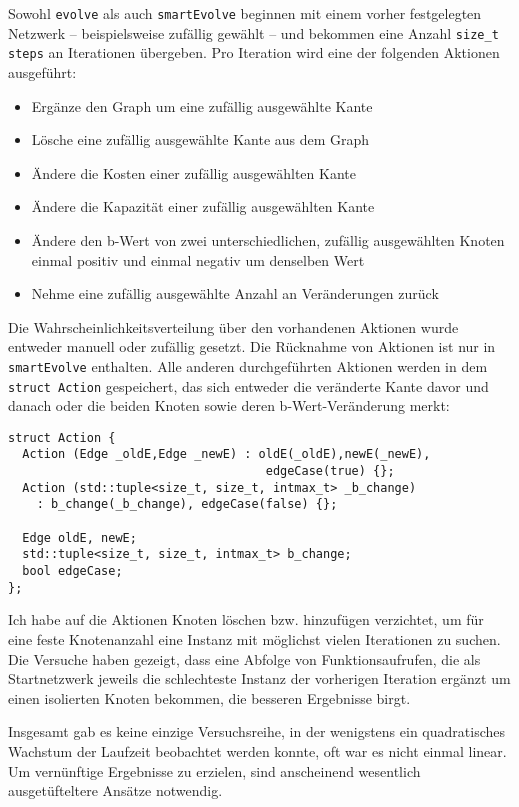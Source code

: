 Sowohl \lstinline|evolve| als auch \lstinline|smartEvolve| beginnen mit einem vorher festgelegten Netzwerk -- beispielsweise zufällig gewählt -- und bekommen eine Anzahl \lstinline|size_t steps| an Iterationen übergeben. Pro Iteration wird eine der folgenden Aktionen ausgeführt:
\begin{itemize}\itemsep0em
    \item Ergänze den Graph um eine zufällig ausgewählte Kante
    \item Lösche eine zufällig ausgewählte Kante aus dem Graph
    \item Ändere die Kosten einer zufällig ausgewählten Kante
    \item Ändere die Kapazität einer zufällig ausgewählten Kante
    \item Ändere den b-Wert von zwei unterschiedlichen, zufällig ausgewählten Knoten einmal positiv und einmal negativ um denselben Wert
    \item Nehme eine zufällig ausgewählte Anzahl an Veränderungen zurück
\end{itemize}

Die Wahrscheinlichkeitsverteilung über den vorhandenen Aktionen wurde entweder manuell oder zufällig gesetzt. Die Rücknahme von Aktionen ist nur in \lstinline|smartEvolve| enthalten. Alle anderen durchgeführten Aktionen werden in dem \lstinline|struct Action| gespeichert, das sich entweder die veränderte Kante davor und danach oder die beiden Knoten sowie deren b-Wert-Veränderung merkt:

\begin{lstlisting}
struct Action {
  Action (Edge _oldE,Edge _newE) : oldE(_oldE),newE(_newE),
                                    edgeCase(true) {};
  Action (std::tuple<size_t, size_t, intmax_t> _b_change)
    : b_change(_b_change), edgeCase(false) {};

  Edge oldE, newE;
  std::tuple<size_t, size_t, intmax_t> b_change;
  bool edgeCase;
};
\end{lstlisting}

Ich habe auf die Aktionen Knoten löschen bzw. hinzufügen verzichtet, um für eine feste Knotenanzahl eine Instanz mit möglichst vielen Iterationen zu suchen. Die Versuche haben gezeigt, dass eine Abfolge von Funktionsaufrufen, die als Startnetzwerk jeweils die schlechteste Instanz der vorherigen Iteration ergänzt um einen isolierten Knoten bekommen, die besseren Ergebnisse birgt.

Insgesamt gab es keine einzige Versuchsreihe, in der wenigstens ein quadratisches Wachstum der Laufzeit beobachtet werden konnte, oft war es nicht einmal linear. Um vernünftige Ergebnisse zu erzielen, sind anscheinend wesentlich ausgetüfteltere Ansätze notwendig.
